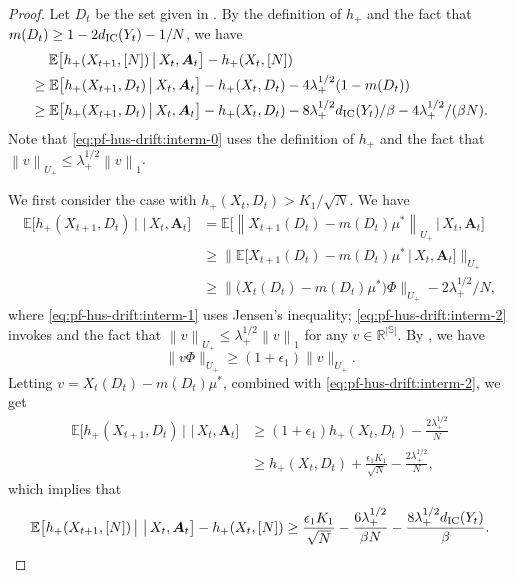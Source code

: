 \documentclass[11pt,letterpaper]{article}
\theoremstyle{plain}
\theoremstyle{definition}
\theoremstyle{remark}
\newcommand{\norm}[1]{\left\lVert#1\right\rVert}
\newcommand{\normplain}[1]{\lVert#1\rVert}
\newcommand{\normbig}[1]{\big\lVert#1\big\rVert}
\newcommand{\Ebig}[1]{\mathbb{E}\big[#1\big]}
\newcommand{\givenbig}{\,\big|\,}
\newcommand{\R}{\mathbb{R}}
\newcommand{\ve}[1]{\bm{#1}}
\newcommand{\veA}{\ve{A}}
\newcommand{\sspa}{\mathbb{S}}
\newcommand{\statdist}{\mu^*}
\newcommand{\disy}{d_{\textup{IC}}}
\newcommand{\gapus}{\epsilon_1} %
\newcommand{\subus}{+}%
\newcommand{\Uus}{U_{\subus}}
\newcommand{\hus}{h_{\subus}}
\newcommand{\lamus}{\lambda_{\subus}}
\begin{document}
\begin{proof}%
    Let $D_t$ be the set given in . By the definition of $\hus$ and the fact that $m(D_t) \geq 1-2\disy(Y_t) - 1/N$, we have
    \begin{align}
        \nonumber
        &\mspace{23mu} \Ebig{\hus(X_{t+1}, [N]) \givenbig X_t, \veA_t} - \hus(X_t, [N])  \\
        \label{eq:pf-hus-drift:interm-0}
        &\geq  \Ebig{\hus(X_{t+1}, D_t)  \givenbig X_t, \veA_t} - \hus(X_t, D_t) - 4\lamus^{1/2} (1-m(D_t))  \\
        \nonumber
        &\geq  \Ebig{\hus(X_{t+1}, D_t)  \givenbig X_t, \veA_t} - \hus(X_t, D_t) - 8 \lamus^{1/2} \disy(Y_t) / \beta - 4\lamus^{1/2} /(\beta N). 
    \end{align}
    Note that \eqref{eq:pf-hus-drift:interm-0} uses the definition of $\hus$ and the fact that $\norm{v}_{\Uus} \leq \lamus^{1/2} \norm{v}_{1}$. 

    We first consider the case with $\hus(X_t, D_t) > K_1 / \sqrt{N}$. We have 
    \begin{align}
        \nonumber
         \Ebig{\hus(X_{t+1}, D_t) \givenbig \givenbig X_t, \veA_t}
        &= \Ebig{\norm{X_{t+1}(D_t) - m(D_t)\statdist}_{\Uus} \givenbig X_t, \veA_t} \\
        \label{eq:pf-hus-drift:interm-1}
        &\geq \normbig{\Ebig{X_{t+1}(D_t) - m(D_t)\statdist \givenbig X_t, \veA_t}}_{\Uus} \\
        \label{eq:pf-hus-drift:interm-2}
        &\geq  \normbig{\big(X_{t}(D_t) - m(D_t)\statdist\big)\Phi}_{\Uus}  - 2\lamus^{1/2}/N, 
    \end{align}
    where \eqref{eq:pf-hus-drift:interm-1} uses Jensen's inequality; 
    \eqref{eq:pf-hus-drift:interm-2} invokes  and the fact that $\norm{v}_{\Uus} \leq \lamus^{1/2} \norm{v}_{1}$ for any $v\in\R^{|\sspa|}$. 
    By , we have 
    \begin{equation*}
        \normplain{v\Phi}_{\Uus} \geq (1 + \gapus) \normplain{v}_{\Uus}. 
    \end{equation*}
    Letting $v = X_{t}(D_t) - m(D_t)\statdist$, combined with \eqref{eq:pf-hus-drift:interm-2}, we get 
    \begin{align*}
         \Ebig{\hus(X_{t+1}, D_t) \givenbig \givenbig X_t, \veA_t} 
         &\geq
         (1+\gapus) \hus(X_t, D_t) - \frac{2\lamus^{1/2}}{N} \\
         &\geq \hus(X_t, D_t) + \frac{\gapus K_1}{\sqrt{N}} - \frac{2\lamus^{1/2}}{N},
    \end{align*}
    which implies that 
    \begin{equation}
        \label{eq:pf-hus-drift:goal-1}
        \Ebig{\hus(X_{t+1}, [N]) \givenbig \givenbig X_t, \veA_t} - \hus(X_t, [N]) \geq \frac{\gapus K_1}{\sqrt{N}} - \frac{6\lamus^{1/2}}{\beta N} -  \frac{8 \lamus^{1/2} \disy(Y_t)}{\beta}. 
    \end{equation}
    

\end{proof}
\end{document}
